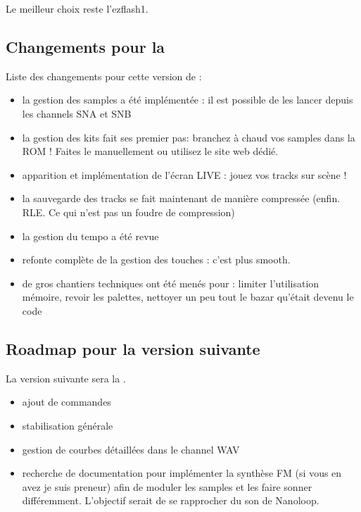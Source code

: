\documentclass[12pt,a4paper]{article}
\begin{document}
    \medskip Le meilleur choix reste l'ezflash1.

    \subsection{Changements pour la \fatversion}
    
    Liste des changements pour cette version de \FAT: \medskip
    \begin{itemize}
        \item{la gestion des samples a été implémentée : il est possible de les lancer depuis les channels SNA et SNB}
        \item{la gestion des kits fait ses premier pas: branchez à chaud vos samples dans la ROM ! Faites le manuellement ou utilisez le site web dédié.}
        \item{apparition et implémentation de l'écran LIVE : jouez vos tracks sur scène !}
	\item{la sauvegarde des tracks se fait maintenant de manière compressée (enfin. RLE. Ce qui n'est pas un foudre de compression)}
	\item{la gestion du tempo a été revue}
        \item{refonte complète de la gestion des touches : c'est plus smooth.}
  	\item{de gros chantiers techniques ont été menés pour : limiter l'utilisation mémoire, revoir les palettes, nettoyer un peu tout le bazar qu'était devenu le code}
    \end{itemize}
    
    \subsection{Roadmap pour la version suivante}
    
    La version suivante sera la \fatnextversion. \medskip    
    \begin{itemize}
        \item{ajout de commandes}
        \item{stabilisation générale}
        \item{gestion de courbes détaillées dans le channel WAV}
        \item{recherche de documentation pour implémenter la synthèse FM (si vous en avez je suis preneur) afin de moduler les samples et les faire sonner différemment.
                    L'objectif serait de se rapprocher du son de Nanoloop.}
    \end{itemize}
    
\end{document}
